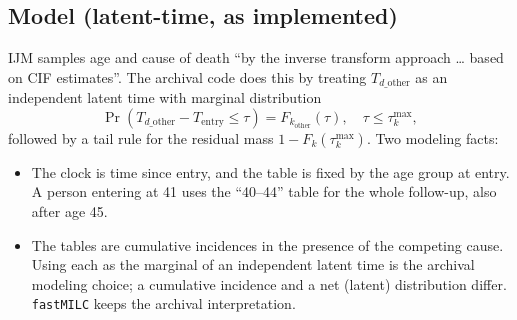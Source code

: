 \documentclass[11pt]{article}
\newcommand{\code}[1]{\texttt{#1}}
\newcommand{\Tentry}{T_{\mathrm{entry}}}
\newcommand{\Tdo}{T_{d\_\mathrm{other}}}
\begin{document}
\subsection{Model (latent-time, as implemented)}
IJM samples age and cause of death ``by the inverse transform approach \ldots
based on CIF estimates''. The archival code does this by treating $\Tdo$ as an
independent latent time with marginal distribution
\begin{equation}\label{eq:TOC}
\Pr(\Tdo - \Tentry \le \tau) = F_{k_{\mathrm{other}}}(\tau), \quad \tau \le \tau^{\max}_k,
\end{equation}
followed by a tail rule for the residual mass $1-F_k(\tau^{\max}_k)$. Two
modeling facts:
\begin{itemize}[nosep]
\item The clock is time since entry, and the table is fixed by the age group
  at entry. A person entering at 41 uses the ``40--44'' table for the whole
  follow-up, also after age 45.
\item The tables are cumulative incidences in the presence of the competing
  cause. Using each as the marginal of an independent latent time is the
  archival modeling choice; a cumulative incidence and a net (latent)
  distribution differ. \code{fastMILC} keeps the archival interpretation.
\end{itemize}
\end{document}
